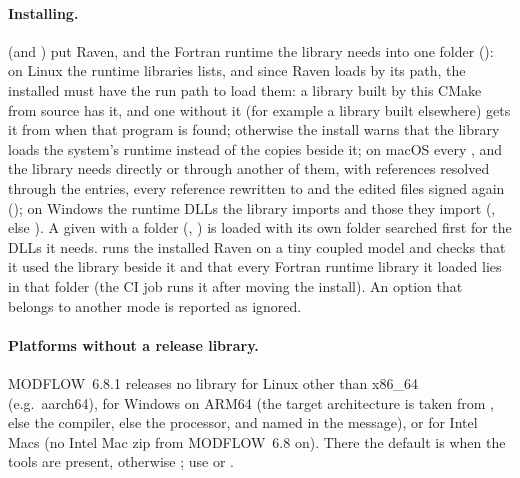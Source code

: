\paragraph{Installing.}  (and ) put Raven,  and the Fortran runtime the library
needs into one  folder (): on Linux the runtime libraries  lists, and
since Raven loads  by its path, the installed  must have the run path  to load
them: a library built by this CMake from source has it, and one without it (for example a  library built
elsewhere) gets it from  when that program is found; otherwise the install warns that the library loads
the system's runtime instead of the copies beside it; on macOS
every ,  and  the library needs directly or through another of them, with
 references resolved through the  entries, every reference rewritten to  and the
edited files signed again (); on Windows the runtime DLLs the library imports and those they import
(, else ). A  given with a folder (, ) is
loaded with its own folder searched first for the DLLs it needs.  runs the
installed Raven on a tiny coupled model and checks that it used the library beside it and that every Fortran runtime
library it loaded lies in that folder (the CI job runs it after moving the install). An option that belongs to another mode is reported as
ignored.

\paragraph{Platforms without a release library.} MODFLOW~6.8.1 releases no library for Linux other than x86\_64 (e.g.\
aarch64), for Windows on ARM64 (the target architecture is taken from , else the compiler, else the
processor, and named in the message), or for Intel Macs (no Intel Mac zip from MODFLOW~6.8 on). There the default is
 when the tools are present, otherwise \cmd{OFF}; use \cmd{SOURCE} or \cmd{PATH}.

